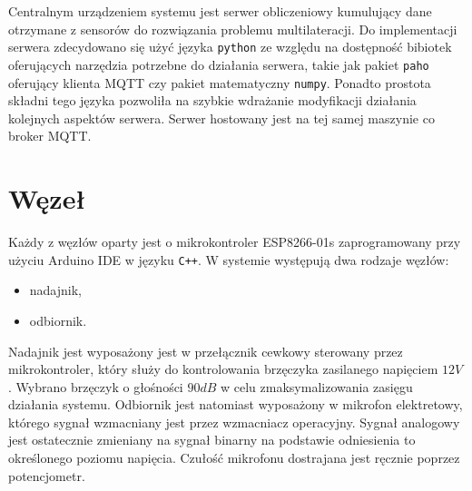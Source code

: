 Centralnym urządzeniem systemu jest serwer obliczeniowy kumulujący dane otrzymane z sensorów do rozwiązania problemu multilateracji. Do implementacji serwera zdecydowano się użyć języka \texttt{python} ze względu na dostępność bibiotek oferujących narzędzia potrzebne do działania serwera, takie jak pakiet \texttt{paho} oferujący klienta MQTT czy pakiet matematyczny \texttt{numpy}. Ponadto prostota składni tego języka pozwoliła na szybkie wdrażanie modyfikacji działania kolejnych aspektów serwera. Serwer hostowany jest na tej samej maszynie co broker MQTT.

\section{Węzeł}

Każdy z węzłów oparty jest o mikrokontroler ESP8266-01s zaprogramowany przy użyciu Arduino IDE w języku \texttt{C++}. W systemie występują dwa rodzaje węzłów:
\begin{itemize}
  \item nadajnik,
  \item odbiornik.
\end{itemize}
Nadajnik jest wyposażony jest w przełącznik cewkowy sterowany przez mikrokontroler, który służy do kontrolowania brzęczyka zasilanego napięciem $12V$. Wybrano brzęczyk o głośności $90dB$ w celu zmaksymalizowania zasięgu działania systemu. Odbiornik jest natomiast wyposażony w mikrofon elektretowy, którego sygnał wzmacniany jest przez wzmacniacz operacyjny. Sygnał analogowy jest ostatecznie zmieniany na sygnał binarny na podstawie odniesienia to określonego poziomu napięcia. Czułość mikrofonu dostrajana jest ręcznie poprzez potencjometr.